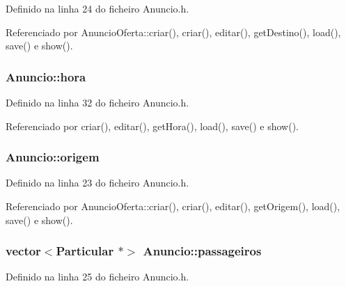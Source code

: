 Definido na linha 24 do ficheiro Anuncio.\+h.



Referenciado por Anuncio\+Oferta\+::criar(), criar(), editar(), get\+Destino(), load(), save() e show().

\hypertarget{class_anuncio_aee851839cb45594b8ee550a032236cfe}{
\subsubsection[{hora}]{ Anuncio\+::hora\hspace{0.3cm}{\ttfamily [protected]}}}\label{class_anuncio_aee851839cb45594b8ee550a032236cfe}


Definido na linha 32 do ficheiro Anuncio.\+h.



Referenciado por criar(), editar(), get\+Hora(), load(), save() e show().

\hypertarget{class_anuncio_a9b3f8ac29ebf2a44e24ea2273064a7f5}{
\subsubsection[{origem}]{ Anuncio\+::origem\hspace{0.3cm}{\ttfamily [protected]}}}\label{class_anuncio_a9b3f8ac29ebf2a44e24ea2273064a7f5}


Definido na linha 23 do ficheiro Anuncio.\+h.



Referenciado por Anuncio\+Oferta\+::criar(), criar(), editar(), get\+Origem(), load(), save() e show().

\hypertarget{class_anuncio_a76cdb1291df7bd8736141304d759ef35}{
\subsubsection[{passageiros}]{\setlength{\rightskip}{0pt plus 5cm}vector$<${\bf Particular} $\ast$$>$ Anuncio\+::passageiros\hspace{0.3cm}{\ttfamily [protected]}}}\label{class_anuncio_a76cdb1291df7bd8736141304d759ef35}


Definido na linha 25 do ficheiro Anuncio.\+h.



